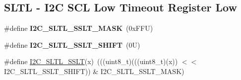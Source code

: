 \subsection*{S\+L\+TL -\/ I2C S\+CL Low Timeout Register Low}
\begin{DoxyCompactItemize}
\item 
\mbox{\label{group___i2_c___register___masks_gac29118698aa1c246c26835a19210a0c9}} 
\#define {\bfseries I2\+C\+\_\+\+S\+L\+T\+L\+\_\+\+S\+S\+L\+T\+\_\+\+M\+A\+SK}~(0x\+F\+F\+U)
\item 
\mbox{\label{group___i2_c___register___masks_ga177f38e09f29a382b35b19906462204f}} 
\#define {\bfseries I2\+C\+\_\+\+S\+L\+T\+L\+\_\+\+S\+S\+L\+T\+\_\+\+S\+H\+I\+FT}~(0\+U)
\item 
\#define \mbox{\hyperlink{group___i2_c___register___masks_gab7bec69c829adac299ed11bd66411507}{I2\+C\+\_\+\+S\+L\+T\+L\+\_\+\+S\+S\+LT}}(x)~(((uint8\+\_\+t)(((uint8\+\_\+t)(x)) $<$$<$ I2\+C\+\_\+\+S\+L\+T\+L\+\_\+\+S\+S\+L\+T\+\_\+\+S\+H\+I\+FT)) \& I2\+C\+\_\+\+S\+L\+T\+L\+\_\+\+S\+S\+L\+T\+\_\+\+M\+A\+SK)
\end{DoxyCompactItemize}
